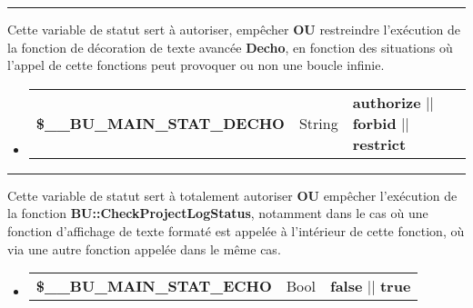 \documentclass[a4paper,10pt]{article}
\begin{document}

\par\noindent\rule{\textwidth}{0.4pt}

\begin{justify}
    Cette variable de statut sert à autoriser, empêcher \textbf{OU} restreindre l'exécution de la fonction de décoration de texte avancée \textbf{\color{mauve}Decho}, en fonction des situations où l'appel de cette fonctions peut provoquer ou non une boucle infinie.
\end{justify}

\begin{justify}
     \begin{itemize}
        \item
        {
            \begin{tabular}{l|l|l}
                \textbf{\color{orange}\$\_\_BU\_MAIN\_STAT\_DECHO}  & String    & \textbf{authorize} || \textbf{forbid} || \textbf{restrict}\\[1\baselineskip]
            \end{tabular}
        }
    \end{itemize}
\end{justify}


\par\noindent\rule{\textwidth}{0.4pt}

\begin{justify}
    Cette variable de statut sert à totalement autoriser \textbf{OU} empêcher l'exécution de la fonction \textbf{\color{mauve}BU::CheckProjectLogStatus}, notamment dans le cas où une fonction d'affichage de texte formaté est appelée à l'intérieur de cette fonction, où via une autre fonction appelée dans le même cas.
\end{justify}

\begin{justify}
     \begin{itemize}
        \item
        {
            \begin{tabular}{l|l|l}
                \textbf{\color{orange}\$\_\_BU\_MAIN\_STAT\_ECHO}   & Bool      & \textbf{false} || \textbf{true}\\[1\baselineskip]
            \end{tabular}
        }
    \end{itemize}
\end{justify}

\end{document}
